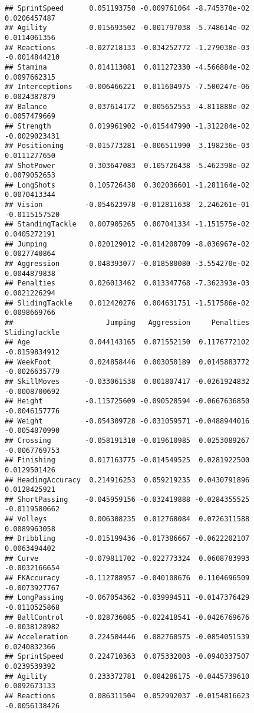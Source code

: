 \documentclass[
]{article}
\begin{document}
\begin{verbatim}
## SprintSpeed      0.051193750 -0.009761064 -8.745378e-02   0.0206457487
## Agility          0.015693502 -0.001797038 -5.748614e-02   0.0114061356
## Reactions       -0.027218133 -0.034252772 -1.279038e-03  -0.0014844210
## Stamina          0.014113081  0.011272330 -4.566884e-02   0.0097662315
## Interceptions   -0.006466221  0.011604975 -7.500247e-06   0.0024387879
## Balance          0.037614172  0.005652553 -4.811888e-02   0.0057479669
## Strength         0.019961902 -0.015447990 -1.312284e-02  -0.0029023431
## Positioning     -0.015773281 -0.006511990  3.198236e-03   0.0111277650
## ShotPower        0.303647083  0.105726438 -5.462398e-02   0.0079052653
## LongShots        0.105726438  0.302036601 -1.281164e-02   0.0070413344
## Vision          -0.054623978 -0.012811638  2.246261e-01  -0.0115157520
## StandingTackle   0.007905265  0.007041334 -1.151575e-02   0.0405272191
## Jumping          0.020129012 -0.014200709 -8.036967e-02   0.0027740864
## Aggression       0.048393077 -0.018580080 -3.554270e-02   0.0044879838
## Penalties        0.026013462  0.013347768 -7.362393e-03   0.0021226294
## SlidingTackle    0.012420276  0.004631751 -1.517586e-02   0.0098669766
##                      Jumping   Aggression     Penalties SlidingTackle
## Age              0.044143165  0.071552150  0.1176772102 -0.0159834912
## WeekFoot         0.024858446  0.003050189  0.0145883772 -0.0026635779
## SkillMoves      -0.033061538  0.001807417 -0.0261924832 -0.0008700692
## Height          -0.115725609 -0.090528594 -0.0667636850 -0.0046157776
## Weight          -0.054309728 -0.031059571 -0.0488944016 -0.0054870990
## Crossing        -0.058191310 -0.019610985  0.0253089267 -0.0067769753
## Finishing        0.017163775 -0.014549525  0.0281922500  0.0129501426
## HeadingAccuracy  0.214916253  0.059219235  0.0430791896  0.0128425921
## ShortPassing    -0.045959156 -0.032419888 -0.0284355525 -0.0119580662
## Volleys          0.006308235  0.012768084  0.0726311588  0.0089963058
## Dribbling       -0.015199436 -0.017386667 -0.0622202107  0.0063494402
## Curve           -0.079811702 -0.022773324  0.0608783993 -0.0032166654
## FKAccuracy      -0.112788957 -0.040108676  0.1104696509 -0.0073927767
## LongPassing     -0.067054362 -0.039994511 -0.0147376429 -0.0110525868
## BallControl     -0.028736085 -0.022418541 -0.0426769676 -0.0038128982
## Acceleration     0.224504446  0.082760575 -0.0854051539  0.0240832366
## SprintSpeed      0.224710363  0.075332003 -0.0940337507  0.0239539392
## Agility          0.233372781  0.084286175 -0.0445739610  0.0092673133
## Reactions        0.086311504  0.052992037 -0.0154816623 -0.0056138426

\end{verbatim}
\end{document}
